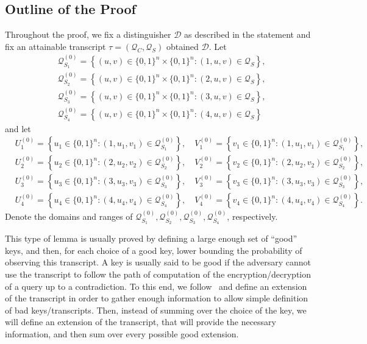 \subsection{Outline of the Proof}
\label{sec:proof-sketch-4-rounds}

Throughout the proof, we fix a distinguisher $\mathcal{D}$ as described in the statement and fix an attainable transcript $\tau =\left(\mathcal{Q}_{C}, \mathcal{Q}_{S}\right)$ obtained $\mathcal{D}$. Let
%
$$
\begin{aligned}
&\mathcal{Q}_{S_{1}}^{(0)}=\left\{(u, v) \in\{0,1\}^{n} \times\{0,1\}^{n}:(1, u, v) \in \mathcal{Q}_{S} \right\},\\
&\mathcal{Q}_{S_{2}}^{(0)}=\left\{(u, v) \in\{0,1\}^{n} \times\{0,1\}^{n}:(2, u, v) \in \mathcal{Q}_{S} \right\},\\
&\mathcal{Q}_{S_{3}}^{(0)}=\left\{(u, v) \in\{0,1\}^{n} \times\{0,1\}^{n}:(3, u, v) \in \mathcal{Q}_{S} \right\},\\
&\mathcal{Q}_{S_{4}}^{(0)}=\left\{(u, v) \in\{0,1\}^{n} \times\{0,1\}^{n}:(4, u, v) \in \mathcal{Q}_{S} \right\}
\end{aligned}
$$
%
and let       {\small
%
\begin{align*}
&U_{1}^{(0)}=\left\{u_{1} \in\{0,1\}^{n}:\left(1, u_{1}, v_{1}\right) \in \mathcal{Q}_{S_{1}}^{(0)}\right\}, \quad V_{1}^{(0)}=\left\{v_{1} \in\{0,1\}^{n}:\left(1, u_{1}, v_{1}\right) \in \mathcal{Q}_{S_{1}}^{(0)}\right\},\\
&U_{2}^{(0)}=\left\{u_{2} \in\{0,1\}^{n}:\left(2, u_{2}, v_{2}\right) \in \mathcal{Q}_{S_{2}}^{(0)}\right\}, \quad V_{2}^{(0)}=\left\{v_{2} \in\{0,1\}^{n}:\left(2, u_{2}, v_{2}\right) \in \mathcal{Q}_{S_{2}}^{(0)}\right\},\\
&U_{3}^{(0)}=\left\{u_{3} \in\{0,1\}^{n}:\left(3, u_{3}, v_{3}\right) \in \mathcal{Q}_{S_{3}}^{(0)}\right\}, \quad V_{3}^{(0)}=\left\{v_{3} \in\{0,1\}^{n}:\left(3, u_{3}, v_{3}\right) \in \mathcal{Q}_{S_{3}}^{(0)}\right\},\\
&U_{4}^{(0)}=\left\{u_{4} \in\{0,1\}^{n}:\left(4, u_{4}, v_{4}\right) \in \mathcal{Q}_{S_{4}}^{(0)}\right\}, \quad V_{4}^{(0)}=\left\{v_{4} \in\{0,1\}^{n}:\left(4, u_{4}, v_{4}\right) \in \mathcal{Q}_{S_{4}}^{(0)}\right\}.
\end{align*}
}%
%
Denote the domains and ranges of $\mathcal{Q}_{S_{1}}^{(0)}, \mathcal{Q}_{S_{2}}^{(0)}, \mathcal{Q}_{S_{3}}^{(0)}, \mathcal{Q}_{S_{4}}^{(0)}$, respectively.



This type of lemma is usually proved by defining a large enough set of ``good'' keys, and then, for each choice of a good key, lower bounding the probability of observing this transcript. A key is usually said to be good if the adversary cannot use the transcript to follow the path of computation of the encryption/decryption of a query up to a contradiction. To this end, we follow~\cite[Sect. 4.2]{C:CDKLST18} and define an extension of the transcript in order to gather enough information to allow simple definition of bad keys/transcripts. Then, instead of summing over the choice of the key, we will define an extension of the transcript, that will provide the necessary information, and then sum over every possible good extension.


